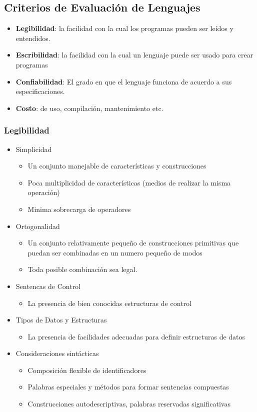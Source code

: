 \documentclass[11pt]{article}
\begin{document}
\subsection*{Criterios de Evaluación de Lenguajes}
\label{sec:orgheadline8}
\begin{itemize}
\item \textbf{Legibilidad}: la facilidad con la cual los programas pueden ser
leídos y entendidos.
\item \textbf{Escribilidad}: la facilidad con la cual un lenguaje puede ser usado
para crear programas
\item \textbf{Confiabilidad}: El grado en que el lenguaje funciona de acuerdo a
sus especificaciones.
\item \textbf{Costo}: de uso, compilación, mantenimiento etc.
\end{itemize}

\subsubsection*{Legibilidad}
\label{sec:orgheadline3}
\begin{itemize}
\item Simplicidad
\begin{itemize}
\item Un conjunto manejable de características y construcciones
\item Poca multiplicidad de características (medios de realizar la misma operación)
\item Minima sobrecarga de operadores
\end{itemize}
\item Ortogonalidad
\begin{itemize}
\item Un conjunto relativamente pequeño de construcciones primitivas que
puedan ser combinadas en un numero pequeño de modos
\item Toda posible combinación sea legal.
\end{itemize}
\item Sentencas de Control
\begin{itemize}
\item La presencia de bien conocidas estructuras de control
\end{itemize}
\item Tipos de Datos y Estructuras
\begin{itemize}
\item La presencia de facilidades adecuadas para definir estructuras de datos
\end{itemize}
\item Consideraciones sintácticas
\begin{itemize}
\item Composición flexible de identificadores
\item Palabras especiales y métodos para formar sentencias compuestas
\item Construcciones autodescriptivas, palabras reservadas
significativas
\end{itemize}
\end{itemize}
\end{document}
